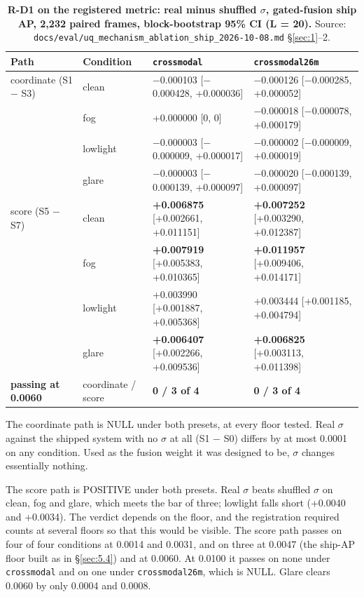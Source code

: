 \documentclass[10pt]{article}
\begin{document}
\begin{table}[htbp]
\centering
\footnotesize
\caption{\textbf{R-D1 on the registered metric: real minus shuffled $\sigma$, gated-fusion ship AP, 2,232 paired frames, block-bootstrap 95\% CI (L = 20).} Source: \texttt{docs/\allowbreak{}eval/\allowbreak{}uq\_\allowbreak{}mechanism\_\allowbreak{}ablation\_\allowbreak{}ship\_\allowbreak{}2026-10-08.md} \S\ref{sec:1}--2.}
\label{tab:4}
\begin{tabularx}{\linewidth}{ll>{\raggedright\arraybackslash}X>{\raggedright\arraybackslash}X}
\toprule
Path & Condition & \texttt{crossmodal} & \texttt{crossmodal26m} \\
\midrule
coordinate (S1 $-$ S3) & clean & $-$0.000103 [$-$0.000428, +0.000036] & $-$0.000126 [$-$0.000285, +0.000052] \\
 & fog & +0.000000 [0, 0] & $-$0.000018 [$-$0.000078, +0.000179] \\
 & lowlight & $-$0.000003 [$-$0.000009, +0.000017] & $-$0.000002 [$-$0.000009, +0.000019] \\
 & glare & $-$0.000003 [$-$0.000139, +0.000097] & $-$0.000020 [$-$0.000139, +0.000097] \\
score (S5 $-$ S7) & clean & \textbf{+0.006875} [+0.002661, +0.011151] & \textbf{+0.007252} [+0.003290, +0.012387] \\
 & fog & \textbf{+0.007919} [+0.005383, +0.010365] & \textbf{+0.011957} [+0.009406, +0.014171] \\
 & lowlight & +0.003990 [+0.001887, +0.005368] & +0.003444 [+0.001185, +0.004794] \\
 & glare & \textbf{+0.006407} [+0.002266, +0.009536] & \textbf{+0.006825} [+0.003113, +0.011398] \\
\textbf{passing at 0.0060} & coordinate / score & \textbf{0 / 3 of 4} & \textbf{0 / 3 of 4} \\
\bottomrule
\end{tabularx}
\end{table}
The coordinate path is NULL under both presets, at every floor tested. Real $\sigma$ against the shipped system with no $\sigma$ at all (S1 $-$ S0) differs by at most 0.0001 on any condition. Used as the fusion weight it was designed to be, $\sigma$ changes essentially nothing.

The score path is POSITIVE under both presets. Real $\sigma$ beats shuffled $\sigma$ on clean, fog and glare, which meets the bar of three; lowlight falls short (+0.0040 and +0.0034). The verdict depends on the floor, and the registration required counts at several floors so that this would be visible. The score path passes on four of four conditions at 0.0014 and 0.0031, and on three at 0.0047 (the ship-AP floor built as in \S\ref{sec:5.4}) and at 0.0060. At 0.0100 it passes on none under \texttt{crossmodal} and on one under \texttt{crossmodal26m}, which is NULL. Glare clears 0.0060 by only 0.0004 and 0.0008.
\end{document}
